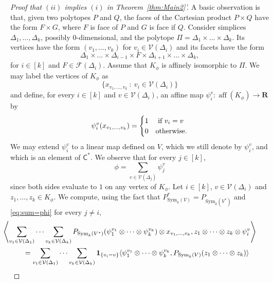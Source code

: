 \documentclass{amsart}
\newcommand{\st}{\ : \ }
\newcommand{\gC}{\mathsf{C}}
\newcommand{\R}{\mathbf{R}}
\DeclareMathOperator{\aff}{\mathrm{aff}}
\newcommand{\Sym}{\mathrm{Sym}}
\theoremstyle{plain}
\begin{document}
\begin{proof}[Proof that $(ii)$ implies $(i)$ in Theorem~\ref{thm:Main2}']
A basic observation is that, given two polytopes $P$ and $Q$, the faces of the Cartesian product $P \times Q$ have the form $F \times G$, where $F$ is face of $P$ and $G$ is face if $Q$. Consider simplices $\Delta_1,\dots,\Delta_k$, possibly $0$-dimensional, and the polytope $\Pi = \Delta_{1} \times \dots \times \Delta_{k}$. Its vertices have the form $(v_1,\dots,v_k)$ for $v_i \in \mathcal{V}(\Delta_{i})$ and its facets have the form
\begin{equation} \label{eq:facets-Pi}
\Delta_{1} \times \dots \times \Delta_{i-1} \times F \times \Delta_{i+1} \times \dots \times \Delta_{k} ,\end{equation}
for $i \in [k]$ and $F \in \mathcal{F}(\Delta_{i})$. Assume that $K_\phi$ is affinely isomorphic to $\Pi$. We may label the vertices of $K_\phi$ as 
\[ \{ x_{v_1,\dots,v_k} \st v_i \in \mathcal{V}(\Delta_i) \} \]
and define, for every $i \in [k]$ and $v \in \mathcal{V}(\Delta_i)$, an affine map $\psi_i^v : \aff(K_\phi) \to \R$ by
\[ \psi_i^v(x_{v_1,\dots,v_k}) = \begin{cases} 1 & \textnormal{ if } v_i=v \\ 0 & \textnormal{otherwise.} \end{cases} \]
We may extend $\psi_i^v$ to a linear map defined on $V$, which we still denote by $\psi_i^v$, and which is an element of $\gC^*$. We observe that for every $j \in [k]$,
\begin{equation} \label{eq:sum=phi} \phi = \sum_{v \in \mathcal{V}(\Delta_j)} \psi_j^v \end{equation}
since both sides evaluate to $1$ on any vertex of $K_\phi$.
Let $i \in [k]$, $v \in \mathcal{V}(\Delta_i)$ and $z_1,\dots,z_k \in K_\phi$. We compute, using the fact that $P_{\Sym_k(V)}^* = P_{\Sym_k(V^*)}$ and \eqref{eq:sum=phi} for every $j \neq i$, 
\begin{align*} 
 \mathllap{\left\langle 
\sum_{v_1 \in \mathcal{V}(\Delta_1)} \dots  \sum_{v_k \in \mathcal{V}(\Delta_k)}  P_{\Sym_k(V^*)} ( \psi_{1}^{v_1} \otimes \dots \otimes \psi_{k}^{v_k} )
\otimes x_{v_1,\dots,v_k}, z_1 \otimes \dots \otimes z_k \otimes \psi_i^v
\right\rangle}
\\
\begin{aligned}
 & = \sum_{v_1 \in \mathcal{V}(\Delta_1)} \dots  \sum_{v_k \in \mathcal{V}(\Delta_k)}
 {\bf 1}_{\{ v_i=v\}} \langle \psi_{1}^{v_1} \otimes \dots \otimes \psi_{k}^{v_k} , P_{\Sym_k(V)} (z_1 \otimes \dots \otimes z_k) \rangle 

\end{aligned}
\end{align*}
\end{proof}
\end{document}
